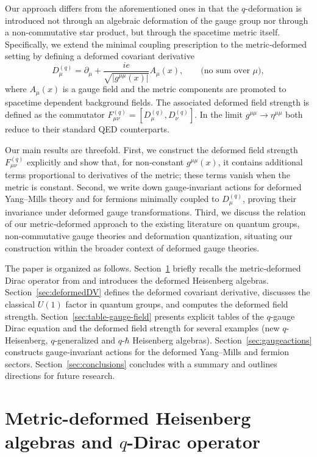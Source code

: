 \documentclass[12pt,a4paper]{article}
\theoremstyle{plain}
\theoremstyle{definition}
\begin{document}
Our approach differs from the aforementioned ones in that the \(q\)-deformation is introduced not through an algebraic deformation of the gauge group nor through a non‑commutative star product, but through the spacetime metric itself. Specifically, we extend the minimal coupling prescription to the metric‑deformed setting by defining a deformed covariant derivative
\[
D_\mu^{(q)} = \partial_\mu + \frac{ie}{\sqrt{|g^{\mu\mu}(x)|}} A_\mu(x), \qquad \text{(no sum over }\mu\text{)},
\]
where \(A_\mu(x)\) is a gauge field and the metric components are promoted to spacetime dependent background fields. The associated deformed field strength is defined as the commutator \(F_{\mu\nu}^{(q)} = [D_\mu^{(q)}, D_\nu^{(q)}]\). In the limit \(g^{\mu\mu}\to\eta^{\mu\mu}\) both reduce to their standard QED counterparts.

Our main results are threefold. First, we construct the deformed field strength \(F_{\mu\nu}^{(q)}\) explicitly and show that, for non‑constant \(g^{\mu\mu}(x)\), it contains additional terms proportional to derivatives of the metric; these terms vanish when the metric is constant. Second, we write down gauge‑invariant actions for deformed Yang–Mills theory and for fermions minimally coupled to \(D_\mu^{(q)}\), proving their invariance under deformed gauge transformations. Third, we discuss the relation of our metric‑deformed approach to the existing literature on quantum groups, non‑commutative gauge theories and deformation quantization, situating our construction within the broader context of deformed gauge theories.

The paper is organized as follows. Section~\ref{sec:prelim} briefly recalls the metric‑deformed Dirac operator from \cite{Jaramillo2026a} and introduces the deformed Heisenberg algebras. Section~\ref{sec:deformedDV} defines the deformed covariant derivative, discusses the classical \(U(1)\) factor in quantum groups, and computes the deformed field strength. Section~\ref{sec:table-gauge-field} presents explicit tables of the \(q\)-gauge Dirac equation and the deformed field strength for several examples (new \(q\)-Heisenberg, \(q\)-generalized and \(q\)-\(\hbar\) Heisenberg algebras). Section~\ref{sec:gaugeactions} constructs gauge‑invariant actions for the deformed Yang–Mills and fermion sectors. Section~\ref{sec:conclusions} concludes with a summary and outlines directions for future research.
\section{Metric-deformed Heisenberg algebras and $q$-Dirac operator}
\label{sec:prelim}
\end{document}
